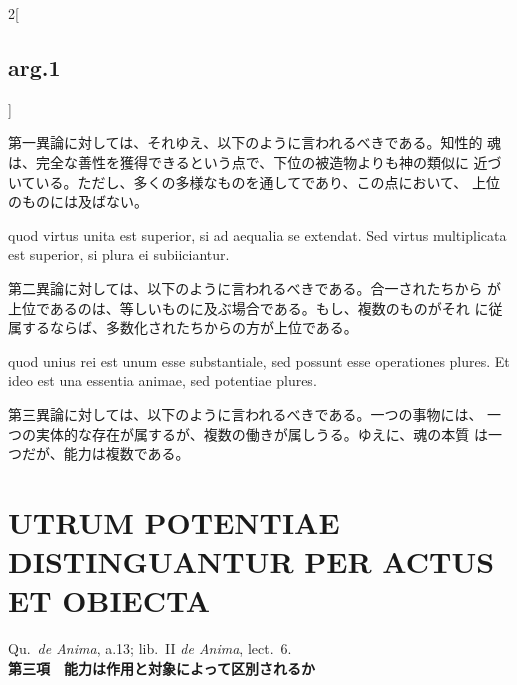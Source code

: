 \documentclass[paper=a4paper,fontsize=10pt,jafontsize=9pt,titlepage]{jlreq}
\begin{document}
\begin{paracol}{2}[\subsection{arg.1}]
 \switchcolumn

 第一異論に対しては、それゆえ、以下のように言われるべきである。知性的
 魂は、完全な善性を獲得できるという点で、下位の被造物よりも神の類似に
 近づいている。ただし、多くの多様なものを通してであり、この点において、
 上位のものには及ばない。

 quod virtus unita est superior, si ad
 aequalia se extendat. Sed virtus multiplicata est superior, si plura
 ei subiiciantur.

 \switchcolumn

 第二異論に対しては、以下のように言われるべきである。合一されたちから
 が上位であるのは、等しいものに及ぶ場合である。もし、複数のものがそれ
 に従属するならば、多数化されたちからの方が上位である。
 
 quod unius rei est unum esse
 substantiale, sed possunt esse operationes plures. Et ideo est una
 essentia animae, sed potentiae plures.

 \switchcolumn

 第三異論に対しては、以下のように言われるべきである。一つの事物には、
 一つの実体的な存在が属するが、複数の働きが属しうる。ゆえに、魂の本質
 は一つだが、能力は複数である。


\end{paracol}

\newpage
 
\section {UTRUM POTENTIAE DISTINGUANTUR PER ACTUS ET OBIECTA}
{\footnotesize Qu.~{\itshape de Anima}, a.13; lib.~II {\itshape de Anima}, lect.~6.}\\

\vspace{2em}
\textbf{{\Large 第三項　能力は作用と対象によって区別されるか}}
\vspace{2em}
\end{document}
